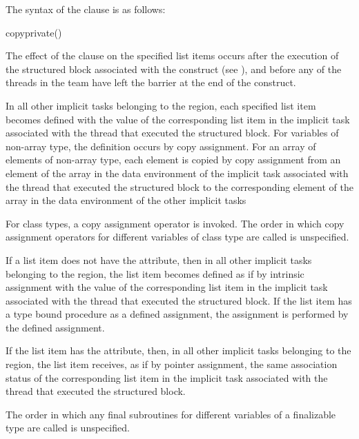\syntax
The syntax of the  clause is as follows:

\begin{ompSyntax}
copyprivate()
\end{ompSyntax}

\descr
The effect of the  clause on the specified list items occurs after the
execution of the structured block associated with the  construct (see
),
and before any of the threads in the team have left the barrier
at the end of the construct.

\begin{ccppspecific}
In all other implicit tasks belonging to the  region, each specified list item
becomes defined with the value of the corresponding list item in the implicit task associated with the
thread that executed the structured block. For variables of non-array type, the definition
occurs by copy assignment. For an array of elements of non-array type, each element is
copied by copy assignment from an element of the array in the data environment of the
implicit task associated with the thread that executed the structured block to the
corresponding element of the array in the data environment of the other implicit tasks
\end{ccppspecific}

\begin{cppspecific}
For class types, a copy assignment operator is invoked. The order in which copy
assignment operators for different variables of class type are called is unspecified.
\end{cppspecific}

\begin{fortranspecific}
If a list item does not have the  attribute, then in all other implicit tasks
belonging to the  region, the list item becomes defined as if by intrinsic
assignment with the value of the corresponding list item in the implicit task associated
with the thread that executed the structured block.  If the list item
has a type bound procedure as a defined assignment, the assignment is
performed by the defined assignment.

If the list item has the  attribute, then, in all other implicit tasks belonging to
the  region, the list item receives, as if by pointer assignment, the same
association status of the corresponding list item in the implicit task associated with the
thread that executed the structured block.

The order in which any final subroutines for different variables of a finalizable type are called is unspecified.
\end{fortranspecific}

